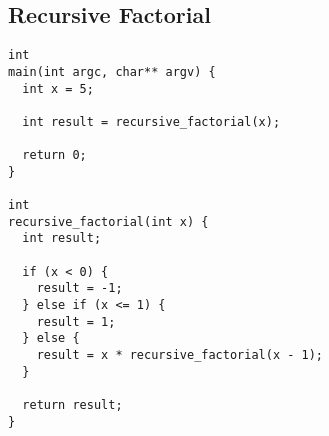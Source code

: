 \documentclass{article}
\begin{document}
\subsection{Recursive Factorial}
\begin{verbatim}
int
main(int argc, char** argv) {
  int x = 5;

  int result = recursive_factorial(x);

  return 0;
}

int
recursive_factorial(int x) {
  int result;

  if (x < 0) {
    result = -1;
  } else if (x <= 1) {
    result = 1;
  } else {
    result = x * recursive_factorial(x - 1);
  }

  return result;
}
\end{verbatim}
\end{document}
